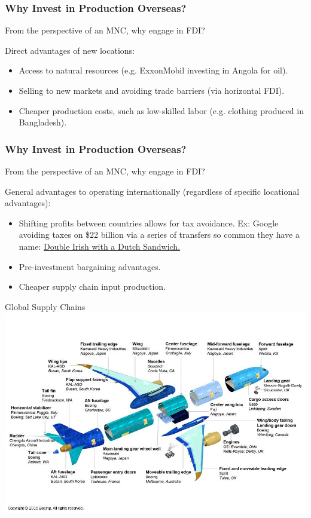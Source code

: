 \documentclass[handout]{beamer}
\begin{document}
\begin{frame} 
	\frametitle{\LARGE{Why Invest in Production Overseas?}}
	From the perspective of an MNC, why engage in FDI?
	\begin{itemize}
		\large{
			\item Direct advantages of new locations: \pause 
			\begin{itemize}
				\item Access to natural resources (e.g. ExxonMobil investing in Angola for oil). \pause 
				\item Selling to new markets and avoiding trade barriers (via horizontal FDI). \pause 
				\item Cheaper production costs, such as low-skilled labor (e.g. clothing produced in Bangladesh).  
			\end{itemize}
		}
	\end{itemize}
\end{frame}

\begin{frame} 
	\frametitle{\LARGE{Why Invest in Production Overseas?}}
	From the perspective of an MNC, why engage in FDI?
	\begin{itemize}
		\large{
			\item General advantages to operating internationally (regardless of specific locational advantages): \pause 
			\begin{itemize}
				\item Shifting profits between countries allows for tax avoidance. Ex: Google avoiding taxes on \$22 billion via a series of transfers so common they have a name: \href{https://www.investopedia.com/terms/d/double-irish-with-a-dutch-sandwich.asp}{Double Irish with a Dutch Sandwich.} \pause 
				\item Pre-investment bargaining advantages.\pause
				\item Cheaper supply chain input production.
			\end{itemize}
		}
	\end{itemize}
\end{frame}


\begin{frame}{\LARGE Global Supply Chains}
	\centering
	\includegraphics[width=\textwidth,height=0.8\textheight,keepaspectratio]{airplane gsc.jpg}
\end{frame}
\end{document}
